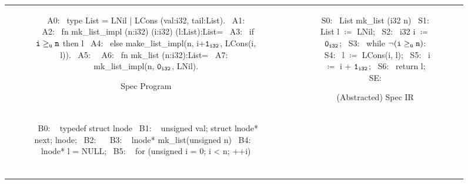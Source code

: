 \begin{figure}[H]
\begin{tabular}{cc}
\begin{subfigure}[b]{0.565\textwidth}
\begin{center}
\begin{allLangEnvScript}
~{\tiny \textcolor{mygray}{A0:}}~ type List = LNil | LCons (val:i32, tail:List).
~{\tiny \textcolor{mygray}{A1:}}~
~{\tiny \textcolor{mygray}{A2:}}~ fn mk_list_impl (n:i32) (i:i32) (l:List):List=
~{\tiny \textcolor{mygray}{A3:}}~    if ${\tt i \geq_u n}$ then l
~{\tiny \textcolor{mygray}{A4:}}~    else make_list_impl(n, i+${\tt 1_{i32}}$, LCons(i, l)).
~{\tiny \textcolor{mygray}{A5:}}~
~{\tiny \textcolor{mygray}{A6:}}~ fn mk_list (n:i32):List=
~{\tiny \textcolor{mygray}{A7:}}~    mk_list_impl(n, ${\tt 0_{i32}}$, LNil).
\end{allLangEnvScript}
\end{center}
\caption{\label{fig:llAllocSpec}Spec Program}
\end{subfigure}%
&
\begin{subfigure}[b]{0.435\textwidth}
\begin{center}
\begin{allLangEnvScript}
~{\tiny \textcolor{mygray}{S0:}}~ List mk_list (i32 n) {
~{\tiny \textcolor{mygray}{S1:}}~   List l $\coloneqq$ LNil;
~{\tiny \textcolor{mygray}{S2:}}~   i32  i $\coloneqq$ ${\tt 0_{i32}}$;
~{\tiny \textcolor{mygray}{S3:}}~   while $\mathrm{\tt \neg (i \geq_{u} n)}$:
~{\tiny \textcolor{mygray}{S4:}}~     l $\coloneqq$ LCons(i, l);
~{\tiny \textcolor{mygray}{S5:}}~     i $\coloneqq$ i + ${\tt 1_{i32}}$;
~{\tiny \textcolor{mygray}{S6:}}~   return l;
~{\tiny \textcolor{mygray}{SE:}}~ }
\end{allLangEnvScript}
\end{center}
\caption{\label{fig:llAllocSpecIR}(Abstracted) Spec IR}
\end{subfigure}%
\\
\begin{subfigure}[b]{0.565\textwidth}
\begin{center}
\begin{allLangEnvScript}
~{\tiny \textcolor{mygray}{B0: }}~ typedef struct lnode {
~{\tiny \textcolor{mygray}{B1: }}~   unsigned val; struct lnode* next; } lnode;
~{\tiny \textcolor{mygray}{B2: }}~ 
~{\tiny \textcolor{mygray}{B3: }}~ lnode* mk_list(unsigned n) {
~{\tiny \textcolor{mygray}{B4: }}~   lnode* l = NULL;
~{\tiny \textcolor{mygray}{B5: }}~   for (unsigned i = 0; i < n; ++i) {                       $\phantom{m \coloneqq \mathrm{\tt m[ \&\structPointer{\tt p}{m}{lnode}{val} \leftarrow i]_{i32}};}$
}}
\end{allLangEnvScript}
\end{center}
\end{subfigure}
\end{tabular}
\end{figure}
